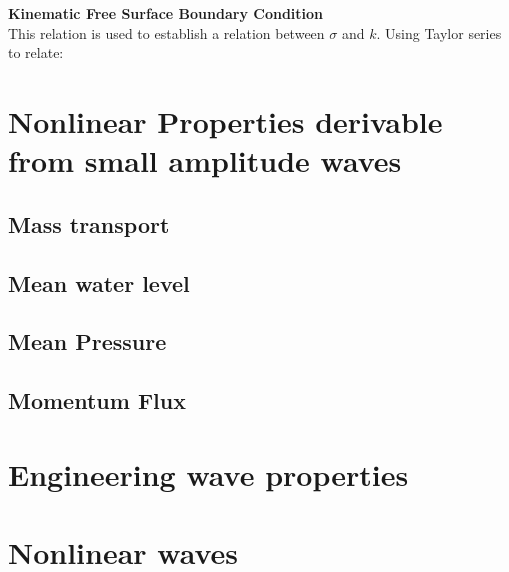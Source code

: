 \documentclass{report}
\begin{document}
\textbf{Kinematic Free Surface Boundary Condition}\\
This relation is used to establish a relation between \( \sigma \) and \( k \). Using Taylor series to relate:


\chapter{Nonlinear Properties derivable from small amplitude waves}
\section{Mass transport}
\section{Mean water level}
\section{Mean Pressure}
\section{Momentum Flux}
\chapter{Engineering wave properties}

\chapter{Nonlinear waves}
\end{document}
